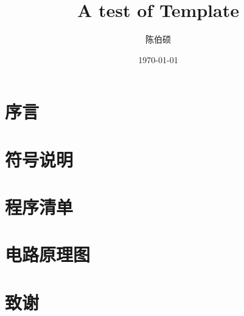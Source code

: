 \documentclass[draft]{XaufeThesisTemplate}
\title{A test of Template}
\author{陈伯硕}
\date{\today}
\begin{document}




\listoftodos



% 

\setcounter{tocdepth}{3}
\tableofcontents
\newpage

\setcounter{page}{1}

\section{序言}
	
\section{符号说明}
	



\nocite{*}

\begin{appendices} %
	\ifdraft{
		
	}
  \section{程序清单}
  \section{电路原理图}
\end{appendices}

\section*{致谢}
	
\end{document}
